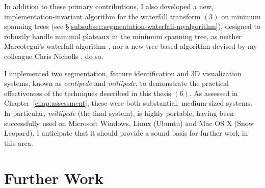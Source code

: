 %
In addition to these primary contributions, I also developed a new, implementation-invariant algorithm for the waterfall transform $(3)$ on minimum spanning trees (see \S\ref{subsubsec:segmentation-waterfall-myalgorithm}), designed to robustly handle minimal plateaux in the minimum spanning tree, as neither Marcotegui's waterfall algorithm \cite{marcotegui05}, nor a new tree-based algorithm devised by my colleague Chris Nicholls \cite{nicholls09}, do so.

I implemented two segmentation, feature identification and 3D visualization systems, known as \emph{centipede} and \emph{millipede}, to demonstrate the practical effectiveness of the techniques described in this thesis $(6)$. As assessed in Chapter~\ref{chap:assessment}, these were both substantial, medium-sized systems. In particular, \emph{millipede} (the final system), is highly portable, having been successfully used on Microsoft Windows, Linux (Ubuntu) and Mac OS X (Snow Leopard). I anticipate that it should provide a sound basis for further work in this area.

\section{Further Work}
\label{sec:conclusions-furtherwork}

\iffalse

